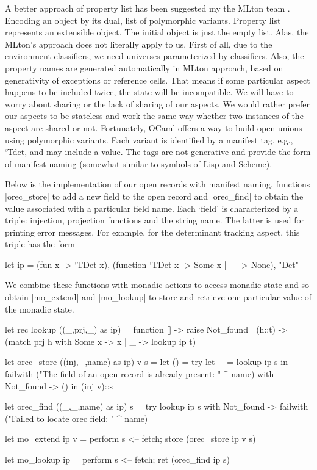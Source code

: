 \documentclass[draft]{elsart}
\begin{document}
A better approach of property list has been suggested my the MLton
team \cite{mlton-proplist}.  Encoding an object by its dual, list of
polymorphic variants.  Property list represents an extensible
object. The initial object is just the empty list. Alas, the MLton's
approach does not literally apply to us. First of all, due to
the environment classifiers, we need universes parameterized by
classifiers. Also, the property names are generated automatically
in MLton approach, based on generativity of exceptions or reference
cells. That means if some particular aspect happens to be included
twice, the state will be incompatible. We will have to worry about
sharing or the lack of sharing of our aspects. We would rather
prefer our aspects to be stateless and work the same way whether two
instances of the aspect are shared or not. Fortunately, OCaml offers a
way to build open unions using polymorphic variants. Each variant is
identified by a manifest tag, e.g., `Tdet, and may include a
value. The tags are not generative and provide the form of manifest
naming (somewhat similar to symbols of Lisp and Scheme).

Below is the implementation of our open records with manifest
naming, functions |orec_store| to add a new field to the open record
and |orec_find| to obtain the value associated with a particular field
name. Each `field' is characterized by a triple: injection, 
projection functions and the string name. The latter is used for 
printing error messages. For example, for the
determinant tracking aspect, this triple has the form
\begin{code}
  let ip = (fun x -> `TDet x), 
           (function `TDet x -> Some x | _ -> None), 
           "Det"
\end{code}
We combine these functions with monadic
actions to access monadic state and so obtain 
|mo_extend| and |mo_lookup| to store and retrieve one particular value
of the monadic state.
\begin{code}
let rec lookup ((_,prj,_) as ip) = 
   function [] -> raise Not_found
   | (h::t) -> (match prj h with Some x -> x | _ -> lookup ip t)

let orec_store ((inj,_,name) as ip) v s =
  let () = 
    try let _ = lookup ip s in 
        failwith ("The field of an open record is already present: " ^ name)
    with Not_found -> () in
  (inj v)::s

let orec_find ((_,_,name) as ip) s =
  try lookup ip s 
  with Not_found -> failwith ("Failed to locate orec field: " ^ name)

let mo_extend ip v = 
  perform s <-- fetch; store (orec_store ip v s)

let mo_lookup ip =
  perform s <-- fetch; ret (orec_find ip s)
\end{code}
\end{document}
